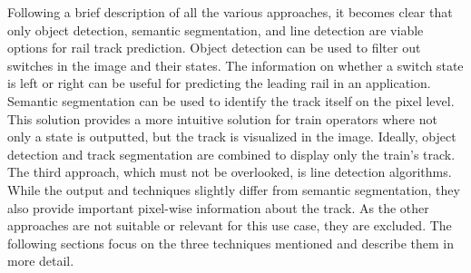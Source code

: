 \vspace{2cm} %

\noindent Following a brief description of all the various approaches, it becomes clear that only object detection, semantic segmentation, and line detection are viable options for rail track prediction.
Object detection can be used to filter out switches in the image and their states.
The information on whether a switch state is left or right can be useful for predicting the leading rail in an application.
Semantic segmentation can be used to identify the track itself on the pixel level.
This solution provides a more intuitive solution for train operators where not only a state is outputted, but the track is visualized in the image.
Ideally, object detection and track segmentation are combined to display only the train's track.
The third approach, which must not be overlooked, is line detection algorithms.
While the output and techniques slightly differ from semantic segmentation, they also provide important pixel-wise information about the track.
As the other approaches are not suitable or relevant for this use case, they are excluded. The following sections focus on the three techniques mentioned and describe them in more detail.